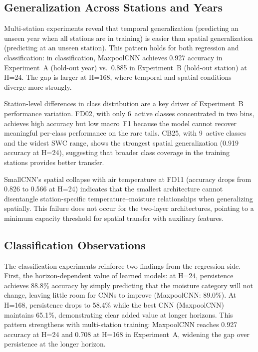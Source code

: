 \documentclass[11pt]{article}
\begin{document}
\subsection{Generalization Across Stations and Years}

Multi-station experiments reveal that temporal generalization (predicting an unseen
year when all stations are in training) is easier than spatial generalization
(predicting at an unseen station). This pattern holds for both regression and
classification: in classification, MaxpoolCNN achieves 0.927 accuracy in
Experiment~A (hold-out year) vs.\ 0.885 in Experiment~B (hold-out station) at
H=24. The gap is larger at H=168, where temporal and spatial conditions diverge
more strongly.

Station-level differences in class distribution are a key driver of Experiment~B
performance variation. FD02, with only 6~active classes concentrated in two bins,
achieves high accuracy but low macro~F1 because the model cannot recover meaningful
per-class performance on the rare tails. CB25, with 9~active classes and the widest
SWC range, shows the strongest spatial generalization (0.919 accuracy at H=24),
suggesting that broader class coverage in the training stations provides better
transfer.

SmallCNN's spatial collapse with air temperature at FD11 (accuracy drops from
0.826 to 0.566 at H=24) indicates that the smallest architecture cannot
disentangle station-specific temperature--moisture relationships when generalizing
spatially. This failure does not occur for the two-layer architectures, pointing
to a minimum capacity threshold for spatial transfer with auxiliary features.

\subsection{Classification Observations}

The classification experiments reinforce two findings from the regression side.
First, the horizon-dependent value of learned models: at H=24, persistence
achieves 88.8\% accuracy by simply predicting that the moisture category
will not change, leaving little room for CNNs to improve (MaxpoolCNN: 89.0\%).
At H=168, persistence drops to 58.4\% while the best CNN (MaxpoolCNN) maintains
65.1\%, demonstrating clear added value at longer horizons. This pattern
strengthens with multi-station training: MaxpoolCNN reaches 0.927 accuracy at
H=24 and 0.708 at H=168 in Experiment~A, widening the gap over persistence
at the longer horizon.
\end{document}

